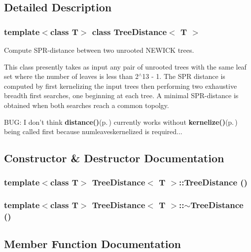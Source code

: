 \subsection{Detailed Description}
\subsubsection*{template$<$class T$>$ class Tree\-Distance$<$ T $>$}

Compute SPR-distance between two unrooted NEWICK trees. 

This class presently takes as input any pair of unrooted trees with the same leaf set where the number of leaves is less than 2$^\wedge$13 - 1. The SPR distance is computed by first kernelizing the input trees then performing two exhaustive breadth first searches, one beginning at each tree. A minimal SPR-distance is obtained when both searches reach a common topolgy.

BUG: I don't think {\bf distance()}{\rm (p.\,\pageref{classTreeDistance_a8})} currently works without {\bf kernelize()}{\rm (p.\,\pageref{classTreeDistance_a7})} being called first because numleaveskernelized is required... 



\subsection{Constructor \& Destructor Documentation}
\subsubsection{\setlength{\rightskip}{0pt plus 5cm}template$<$class T$>$ {\bf Tree\-Distance}$<$ T $>$::{\bf Tree\-Distance} ()}\label{classTreeDistance_a0}


\subsubsection{\setlength{\rightskip}{0pt plus 5cm}template$<$class T$>$ {\bf Tree\-Distance}$<$ T $>$::$\sim${\bf Tree\-Distance} ()}\label{classTreeDistance_a1}




\subsection{Member Function Documentation}
